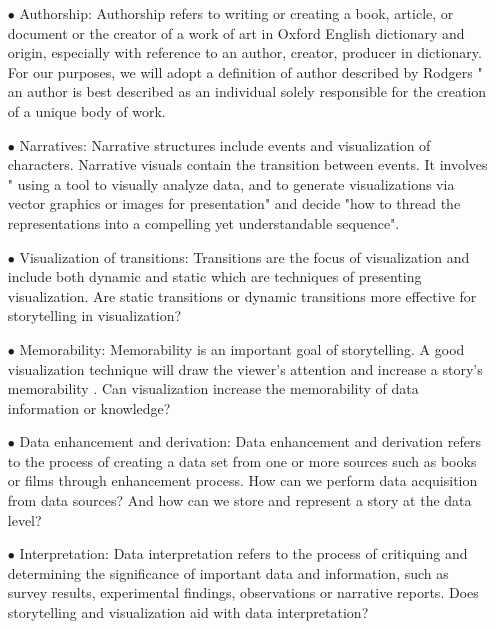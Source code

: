\documentclass{egpubl}
\begin{document}
\begin{enumerate}
\item[$\bullet$] Authorship: Authorship refers to writing or creating a book, article, or document or the creator of a work of art in Oxford English dictionary\cite{authoship2} and origin, especially with reference to an author, creator, producer in dictionary\cite{authoship1}. For our purposes, we will adopt a definition of author described by Rodgers\cite{rodgers2011} " an author is best described as an individual solely responsible for the creation of a unique body of work. 
\item[$\bullet$] Narratives: Narrative structures include events and visualization of characters. Narrative visuals contain the transition between events. It involves " using a tool to visually analyze data, and to generate visualizations via vector graphics or images for presentation" and decide "how to thread the representations into a compelling yet understandable sequence"\cite{hullman2013deeper}.
 
\item[$\bullet$] Visualization of transitions: Transitions are the focus of visualization and include both dynamic and static which are techniques of presenting visualization. Are static transitions or dynamic transitions more effective for storytelling in visualization?

\item[$\bullet$]Memorability: Memorability is an important goal of storytelling. A good visualization technique will draw the viewer's attention and increase a story's memorability \cite{bateman}. Can visualization increase the memorability of data information or knowledge?

\item[$\bullet$] Data enhancement and derivation: Data enhancement and derivation refers to the process of creating a data set from one or more sources such as books or films through enhancement process. How can we perform data acquisition from data sources? And how can we store and represent a story at the data level?

\item[$\bullet$] Interpretation: Data interpretation refers to the process of critiquing and determining the significance of important data and information, such as survey results, experimental findings, observations or narrative reports. Does storytelling and visualization aid with data interpretation?

\end{enumerate}
\end{document}

